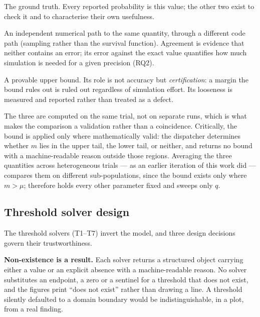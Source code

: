\begin{description}[leftmargin=1.3em,style=nextline,itemsep=2pt]
\item[Exact binomial.] The ground truth. Every reported probability is
  this value; the other two exist to check it and to characterise their
  own usefulness.
\item[Monte Carlo.] An independent numerical path to the same quantity,
  through a different code path (sampling rather than the survival
  function). Agreement is evidence that neither contains an error;
  its error against the exact value quantifies how much simulation is
  needed for a given precision (RQ2).
\item[Chernoff bound.] A provable upper bound. Its role is not accuracy
  but \emph{certification}: a margin the bound rules out is ruled out
  regardless of simulation effort. Its looseness is measured and
  reported rather than treated as a defect.
\end{description}

The three are computed on the same trial, not on separate runs, which
is what makes the comparison a validation rather than a coincidence.
Critically, the bound is applied only where mathematically valid: the
dispatcher determines whether $m$ lies in the upper tail, the lower
tail, or neither, and returns no bound with a machine-readable reason
outside those regions. Averaging the three quantities across
heterogeneous trials --- as an earlier iteration of this work did ---
compares them on different sub-populations, since the bound exists only
where $m > \mu$;  therefore holds every other
parameter fixed and sweeps only $q$.

\subsection{Threshold solver design}
\label{sec:method-thresholds}

The threshold solvers (T1--T7) invert the model, and three design
decisions govern their trustworthiness.

\textbf{Non-existence is a result.} Each solver returns a structured
object carrying either a value or an explicit absence with a
machine-readable reason. No solver substitutes an endpoint, a zero or a
sentinel for a threshold that does not exist, and the figures print
``does not exist'' rather than drawing a line. A threshold silently
defaulted to a domain boundary would be indistinguishable, in a plot,
from a real finding.

